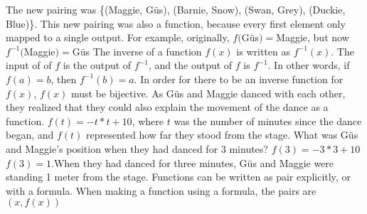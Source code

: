 {The new pairing was \{(Maggie, G{\"u}s), (Barnie, Snow), (Swan, Grey), (Duckie, Blue)\}. This new pairing was also a function, because every first element only mapped to a single output. For example, originally, $f($G{\"u}s$)= $Maggie, but now $f^{-1}($Maggie$) = $G{\"u}s}
{The inverse of a function $f(x)$ is written as $f^{-1}(x)$. The input of of $f$ is the output of $f^{-1}$, and the output of $f$ is $f^{-1}$. In other words, if $f(a)=b$, then $f^{-1}(b) = a$. In order for there to be an inverse function for $f(x)$, $f(x)$ must be bijective. }
{}
{As G{\"u}s and Maggie danced with each other, they realized that they could also explain the movement of the dance as a function. $f(t) = -t\ast t+10$, where $t$ was the number of minutes since the dance began, and $f(t)$ represented how far they stood from the stage. What was G{\"u}s and Maggie's position when they had danced for 3 minutes?}
{$f(3) = -3\ast 3 + 10$\linebreak $f(3)=1$.\linebreak When they had danced for three minutes, G{\"u}s and Maggie were standing 1 meter from the stage.}
{Functions can be written as pair explicitly, or with a formula. When making a function using a formula, the pairs are $(x, f(x))$}
{}
